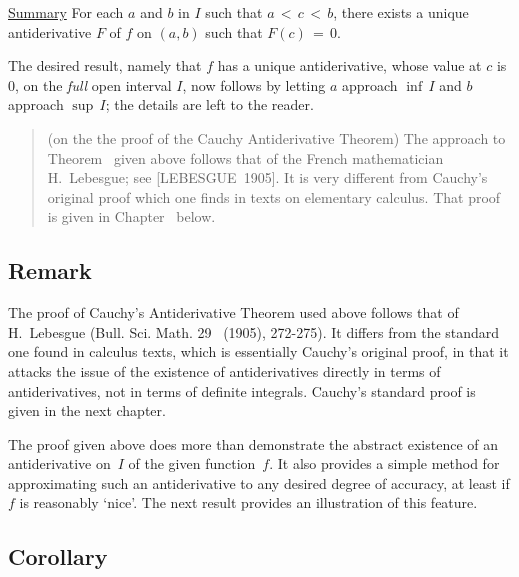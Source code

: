 {\V

        \underline{Summary} For each $a$ and $b$ in $I$ such that $a\,<\,c\,<\,b$,
    there exists a unique antiderivative $F$ of $f$ on $(a,b)$ such that $F(c) \,=\, 0$.

        The desired result, namely that $f$ has a unique antiderivative, whose value at $c$ is $0$, on the {\em full} open interval $I$,
    now follows by letting $a$ approach ${\inf}\,I$ and $b$ approach ${\sup}\,I$; the details are left to the reader. \Q

\VV

\begin{quotation}
{\footnotesize \underline{\Note} (on the the proof of the Cauchy Antiderivative Theorem)
    The approach to Theorem~ given above follows that of the French mathematician H.~Lebesgue; see [LEBESGUE~1905]. 
    It is very different from Cauchy's original proof which one finds in texts on elementary calculus. That proof is given in Chapter~ below.
}%
\end{quotation}

\VV

             \subsection{\small{\bf Remark}}
            \label{RemrkE45.126A}

\V

        The proof of Cauchy's Antiderivative Theorem used above follows that of H.~Lebesgue (Bull. Sci. Math. 29~ (1905), 272-275).
    It differs from the standard one found in calculus texts, which is essentially Cauchy's original proof,
    in that it attacks the issue of the existence of antiderivatives directly in terms of antiderivatives, not in terms of definite integrals.
    Cauchy's standard proof is given in the next chapter.

    \VV


        The proof given above does more than demonstrate the abstract existence of an antiderivative on~$I$ of the given function~$f$.
    It also provides a simple method for approximating such an antiderivative to any desired degree of accuracy, at least if $f$ is reasonably `nice'.
    The next result provides an illustration of this feature.


\V

             \subsection{\small{\bf Corollary}}
            \label{CorE45.126B}

}

